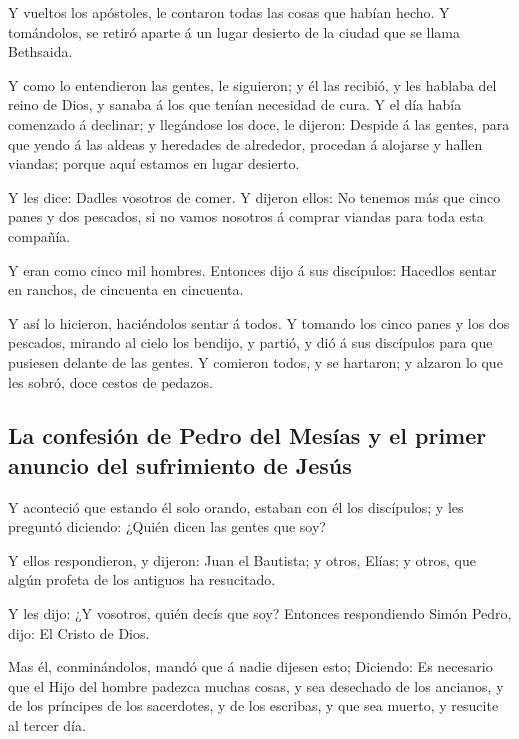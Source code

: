  Y vueltos los apóstoles, le contaron todas las cosas que
habían hecho. Y tomándolos, se retiró aparte á un lugar desierto de la
ciudad que se llama Bethsaida.

 Y como lo entendieron las gentes, le siguieron; y él las
recibió, y les hablaba del reino de Dios, y sanaba á los que tenían
necesidad de cura.  Y el día había comenzado á declinar;
y llegándose los doce, le dijeron: Despide á las gentes, para que yendo
á las aldeas y heredades de alrededor, procedan á alojarse y hallen
viandas; porque aquí estamos en lugar desierto.

 Y les dice: Dadles vosotros de comer. Y dijeron ellos:
No tenemos más que cinco panes y dos pescados, si no vamos nosotros á
comprar viandas para toda esta compañía.

 Y eran como cinco mil hombres. Entonces dijo á sus
discípulos: Hacedlos sentar en ranchos, de cincuenta en cincuenta.

 Y así lo hicieron, haciéndolos sentar á todos.
 Y tomando los cinco panes y los dos pescados, mirando al
cielo los bendijo, y partió, y dió á sus discípulos para que pusiesen
delante de las gentes.  Y comieron todos, y se hartaron;
y alzaron lo que les sobró, doce cestos de pedazos.

\hypertarget{la-confesiuxf3n-de-pedro-del-mesuxedas-y-el-primer-anuncio-del-sufrimiento-de-jesuxfas}{%
\subsection{La confesión de Pedro del Mesías y el primer anuncio del
sufrimiento de
Jesús}\label{la-confesiuxf3n-de-pedro-del-mesuxedas-y-el-primer-anuncio-del-sufrimiento-de-jesuxfas}}

 Y aconteció que estando él solo orando, estaban con él
los discípulos; y les preguntó diciendo: ¿Quién dicen las gentes que
soy?

 Y ellos respondieron, y dijeron: Juan el Bautista; y
otros, Elías; y otros, que algún profeta de los antiguos ha resucitado.

 Y les dijo: ¿Y vosotros, quién decís que soy? Entonces
respondiendo Simón Pedro, dijo: El Cristo de Dios.

 Mas él, conminándolos, mandó que á nadie dijesen esto;
 Diciendo: Es necesario que el Hijo del hombre padezca
muchas cosas, y sea desechado de los ancianos, y de los príncipes de los
sacerdotes, y de los escribas, y que sea muerto, y resucite al tercer
día.

